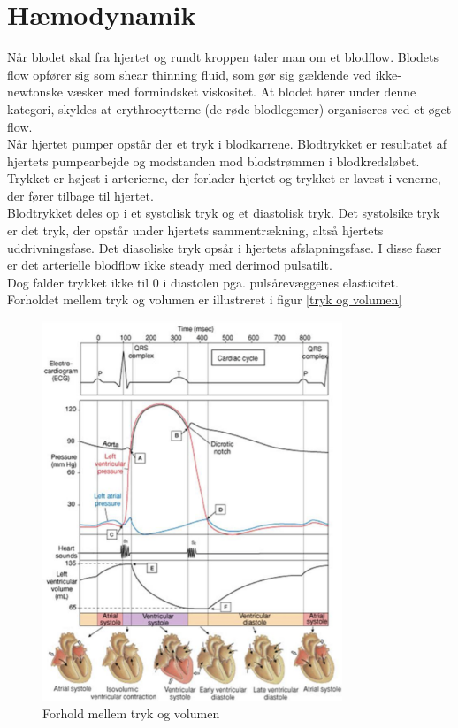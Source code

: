 \section{Hæmodynamik}
Når blodet skal fra hjertet og rundt kroppen taler man om et blodflow. Blodets flow opfører sig som shear thinning fluid, som gør sig gældende ved ikke-newtonske væsker med formindsket viskositet. At blodet hører under denne kategori, skyldes at erythrocytterne (de røde blodlegemer) organiseres ved et øget flow. \\
Når hjertet pumper opstår der et tryk i blodkarrene. Blodtrykket er resultatet af hjertets pumpearbejde og modstanden mod blodstrømmen i blodkredsløbet. Trykket er højest i arterierne, der forlader hjertet og trykket er lavest i venerne, der fører tilbage til hjertet.\cite{haemo}\\
Blodtrykket deles op i et systolisk tryk og et diastolisk tryk. Det systolsike tryk er det tryk, der opstår under hjertets sammentrækning, altså hjertets uddrivningsfase. Det diasoliske tryk opsår i hjertets afslapningsfase. I disse faser er det arterielle blodflow ikke steady med derimod pulsatilt. \\Dog falder trykket ikke til 0 i diastolen pga. pulsårevæggenes elasticitet. Forholdet mellem tryk og volumen er illustreret i figur \ref{tryk og volumen}
\begin{figure}[H]
	\centering
	\includegraphics[width=0.8\textwidth]{Figurer/Fysio/TrykOgVolumen}
	\caption{Forhold mellem tryk og volumen\protect\cite{tryk}}
	\label{tryk og volumen }
\end{figure}
